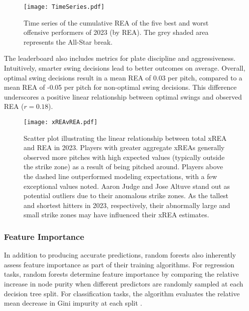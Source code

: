 \documentclass[12pt]{article}
\numberwithin{equation}{section}
\begin{document}
\vspace{5mm} %

\begin{figure}[h]
    \centering
    \texttt{[image: TimeSeries.pdf]}
    \caption{Time series of the cumulative REA of the five best and worst offensive performers of 2023 (by REA). The grey shaded area represents the All-Star break.}
    \label{fig:TimeSeries}
\end{figure}

The leaderboard also includes metrics for plate discipline and aggressiveness. Intuitively, smarter swing decisions lead to better outcomes on average. Overall, optimal swing decisions result in a mean REA of 0.03 per pitch, compared to a mean REA of -0.05 per pitch for non-optimal swing decisions. This difference underscores a positive linear relationship between optimal swings and observed REA ($r = 0.18$).

\begin{figure}[h]
    \centering
    \texttt{[image: xREAvREA.pdf]}
    \caption{Scatter plot illustrating the linear relationship between total xREA and REA in 2023. Players with greater aggregate xREAs generally observed more pitches with high expected values (typically outside the strike zone) as a result of being pitched around. Players above the dashed line outperformed modeling expectations, with a few exceptional values noted. Aaron Judge and Jose Altuve stand out as potential outliers due to their anomalous strike zones. As the tallest and shortest hitters in 2023, respectively, their abnormally large and small strike zones may have influenced their xREA estimates.}
    \label{fig:xREAvREA}
\end{figure}

\subsubsection{Feature Importance}

In addition to producing accurate predictions, random forests also inherently assess feature importance as part of their training algorithms. For regression tasks, random forests determine feature importance by comparing the relative increase in node purity when different predictors are randomly sampled at each decision tree split. For classification tasks, the algorithm evaluates the relative mean decrease in Gini impurity at each split \parencite{caret}. 

\vspace{5mm} %
\end{document}
